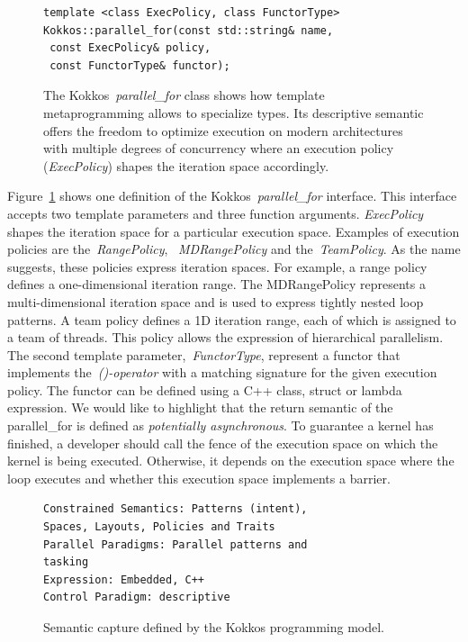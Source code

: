 \begin{figure}
\begin{verbatim}
template <class ExecPolicy, class FunctorType>
Kokkos::parallel_for(const std::string& name, 
 const ExecPolicy& policy, 
 const FunctorType& functor);
\end{verbatim}
\caption{The Kokkos~\emph{parallel\_for} class shows how template metaprogramming allows to specialize types. Its descriptive semantic offers the freedom to optimize execution on modern architectures with multiple degrees of concurrency where an execution policy (\emph{ExecPolicy}) shapes the iteration space accordingly.}
\label{fig:parallelFor}
\end{figure}

Figure~\ref{fig:parallelFor} shows one definition of the Kokkos~\emph{parallel\_for} interface. This interface accepts two template parameters and three function arguments. \emph{ExecPolicy} shapes the iteration space for a particular execution space. Examples of execution policies are the~\emph{RangePolicy}, ~\emph{MDRangePolicy} and the~\emph{TeamPolicy}. As the name suggests, these policies express iteration spaces. For example, a range policy defines a one-dimensional iteration range. The MDRangePolicy represents a multi-dimensional iteration space and is used to express tightly nested loop patterns. A team policy defines a 1D iteration range, each of which is assigned to a team of threads. This policy allows the expression of hierarchical parallelism. The second template parameter,~\emph{FunctorType}, represent a functor that implements the~\emph{()-operator} with a matching signature for the given execution policy. The functor can be defined using a C++ class, struct or lambda expression. We would like to highlight that the return semantic of the parallel\_for is defined as \emph{potentially asynchronous}. To guarantee a kernel has finished, a developer should call the fence of the execution space on which the kernel is being executed. Otherwise, it depends on the execution space where the loop executes and whether this execution space implements a barrier. 

\begin{figure}[h]
\begin{verbatim}
Constrained Semantics: Patterns (intent),
Spaces, Layouts, Policies and Traits
Parallel Paradigms: Parallel patterns and 
tasking
Expression: Embedded, C++
Control Paradigm: descriptive
\end{verbatim}
\caption{Semantic capture defined by the Kokkos programming model.}
\label{fig:SemCaptureKokkos}
\end{figure}

